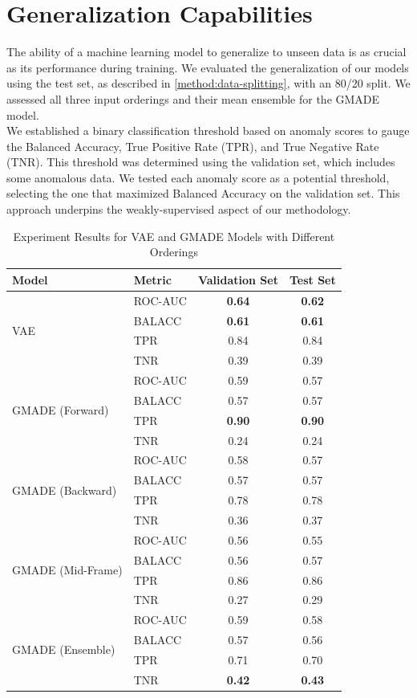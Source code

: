 \section{Generalization Capabilities}
The ability of a machine learning model to generalize to unseen data is as crucial as its performance during training. We evaluated the generalization of our models using the test set, as described in \autoref{method:data-splitting}, with an 80/20 split. We assessed all three input orderings and their mean ensemble for the GMADE model.\\
We established a binary classification threshold based on anomaly scores to gauge the Balanced Accuracy, True Positive Rate (TPR), and True Negative Rate (TNR). This threshold was determined using the validation set, which includes some anomalous data. We tested each anomaly score as a potential threshold, selecting the one that maximized Balanced Accuracy on the validation set. This approach underpins the weakly-supervised aspect of our methodology.

\begin{table}[h!]
    \centering
    \caption{Experiment Results for VAE and GMADE Models with Different Orderings}
    \begin{tabular}{|l|l|c|c|}
    \hline
    \textbf{Model} & \textbf{Metric} & \textbf{Validation Set} & \textbf{Test Set} \\
    \hline
    \multirow{4}{*}{VAE} 
    & ROC-AUC & \textbf{0.64} & \textbf{0.62} \\
    & BALACC  & \textbf{0.61} & \textbf{0.61} \\
    & TPR     & 0.84 & 0.84 \\
    & TNR     & 0.39 & 0.39 \\
    \hline
    \multirow{4}{*}{GMADE (Forward)}
    & ROC-AUC & 0.59 & 0.57 \\
    & BALACC  & 0.57 & 0.57 \\
    & TPR     & \textbf{0.90} & \textbf{0.90} \\
    & TNR     & 0.24 & 0.24 \\
    \hline
    \multirow{4}{*}{GMADE (Backward)}
    & ROC-AUC & 0.58 & 0.57 \\
    & BALACC  & 0.57 & 0.57 \\
    & TPR     & 0.78 & 0.78 \\
    & TNR     & 0.36 & 0.37 \\
    \hline
    \multirow{4}{*}{GMADE (Mid-Frame)}
    & ROC-AUC & 0.56 & 0.55 \\
    & BALACC  & 0.56 & 0.57 \\
    & TPR     & 0.86 & 0.86 \\
    & TNR     & 0.27 & 0.29 \\
    \hline
    \multirow{4}{*}{GMADE (Ensemble)}
    & ROC-AUC & 0.59 & 0.58 \\
    & BALACC  & 0.57 & 0.56 \\
    & TPR     & 0.71 & 0.70 \\
    & TNR     & \textbf{0.42} & \textbf{0.43} \\
    \hline
    \end{tabular}
\end{table}

